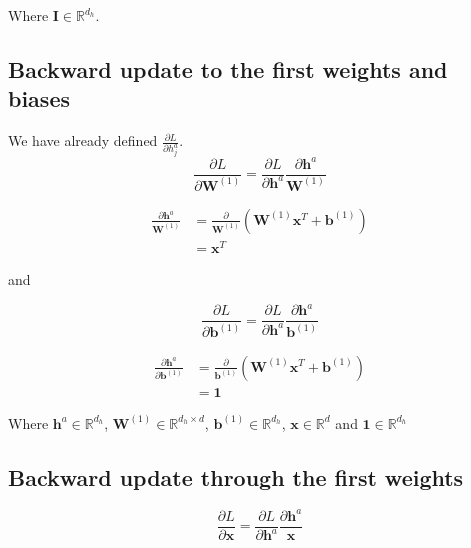 \documentclass[reqno]{amsart}
\theoremstyle{definition}
\theoremstyle{remark}
\numberwithin{equation}{section}
\begin{document}
Where $\mathbf{I} \in \mathbb{R}^{d_h}$.\\

\subsection{Backward update to the first weights and biases}

We have already defined $\frac{\partial L}{\partial h^a_j}$. \\

\begin{equation}
    \frac{\partial L}{\partial \mathbf{W}^{(1)}} = \frac{\partial L}{\partial \mathbf{h}^a}\frac{\partial \mathbf{h}^a}{ \mathbf{W}^{(1)}}
\end{equation}

\begin{align}
    \frac{\partial \mathbf{h}^a}{ \mathbf{W}^{(1)}} &= \frac{\partial}{\mathbf{W}^{(1)}} (\mathbf{W}^{(1)} \mathbf{x}^T+ \mathbf{b}^{(1)}) \\
    &= \mathbf{x}^T
\end{align}

and

\begin{equation}
    \frac{\partial L}{\partial \mathbf{b}^{(1)}} = \frac{\partial L}{\partial \mathbf{h}^a}\frac{\partial \mathbf{h}^a}{ \mathbf{b}^{(1)}}
\end{equation}

\begin{align}
    \frac{\partial \mathbf{h}^a}{ \partial \mathbf{b}^{(1)}} &= \frac{\partial}{\mathbf{b}^{(1)}} (\mathbf{W}^{(1)} \mathbf{x}^T+ \mathbf{b}^{(1)}) \\
    &= \mathbf{1}
\end{align}

Where $\mathbf{h}^{a} \in \mathbb{R}^{d_h}$, $\mathbf{W}^{(1)} \in \mathbb{R}^{d_h \times d}$, $\mathbf{b}^{(1)} \in \mathbb{R}^{d_h}$, $\mathbf{x} \in \mathbb{R}^{d}$ and $\mathbf{1} \in \mathbb{R}^{d_h}$\\

\subsection{Backward update through the first weights}

\begin{equation}
    \frac{\partial L}{\partial \mathbf{x}} = \frac{\partial L}{\partial \mathbf{h}^a}\frac{\partial \mathbf{h}^a}{ \mathbf{x}}
\end{equation}\\
\end{document}
